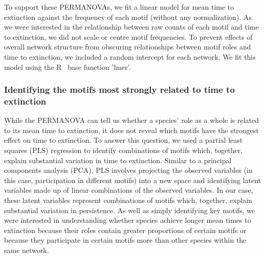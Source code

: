 \documentclass[12pt]{article}
\begin{document}
			To support these PERMANOVAs, we fit a linear model for mean time to extinction against the frequency of each motif (without any normalization).
			As we were interested in the relationship between raw counts of each motif and time to extinction, we did not scale or centre motif frequencies.
			To prevent effects of overall network structure from obscuring relationships between motif roles and time to extinction, we included a random intercept for each network.
			We fit this model using the R~\citep{R} base function 'lmer'.




		\subsubsection*{Identifying the motifs most strongly related to time to extinction}

			While the PERMANOVA can tell us whether a species' role as a whole is related to its mean time to extinction, it does not reveal which motifs have the strongest effect on time to extinction.
			To answer this question, we used a partial least squares (PLS) regression to identify combinations of motifs which, together, explain substantial variation in time to extinction. 
			Similar to a principal components analysis (PCA), PLS involves projecting the observed variables (in this case, participation in different motifs) into a new space and identifying latent variables made up of linear combinations of the observed variables.
			In our case, these latent variables represent combinations of motifs which, together, explain substantial variation in persistence.
			As well as simply identifying key motifs, we were interested in understanding whether species achieve longer mean times to extinction because their roles contain greater proportions of certain motifs or because they participate in certain motifs more than other species within the same network.
			
\end{document}
